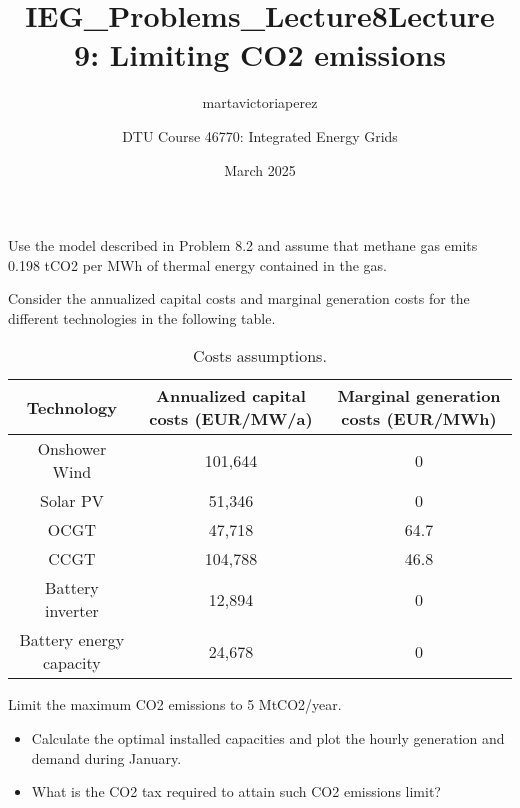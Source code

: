 \documentclass[10pt]{article}
\title{IEG_Problems_Lecture8}
\author{martavictoriaperez }
\date{March 2025}
\newenvironment{problem}[2][Problem]{\begin{trivlist}
\item[\hskip \labelsep {\bfseries #1}\hskip \labelsep {\bfseries #2.}]}{\end{trivlist}}
\begin{document}
 
\title{\textbf{Lecture 9: Limiting CO2 emissions}}
\author{
DTU Course 46770: Integrated Energy Grids }
\maketitle

\begin{problem}{9.1}
Use the model described in Problem 8.2 and assume that methane gas emits 0.198 tCO2 per MWh of thermal energy contained in the gas. 

Consider the annualized capital costs and marginal generation costs for the different technologies in the following table.

\begin{table}[h]
    \centering
    \begin{tabular}{ccc}
    \hline
        Technology & Annualized capital costs (EUR/MW/a) & Marginal generation costs (EUR/MWh) \\
    \hline
    Onshower Wind &  101,644 & 0 \\
         Solar PV &  51,346 & 0 \\
         OCGT & 47,718 &  64.7  \\
         CCGT & 104,788 &  46.8   \\
         Battery inverter & 12,894  & 0 \\
         Battery energy capacity &  24,678 & 0 \\
    \hline
    \end{tabular}
    \caption{Costs assumptions.}
    \label{tab:my_label}
\end{table}


Limit the maximum CO2 emissions to 5 MtCO2/year. 

\begin{itemize}
\item[a)] Calculate the optimal installed capacities and plot the hourly generation and demand during January.
\item[b)] What is the CO2 tax required to attain such CO2 emissions limit?
\end{itemize}

\end{problem}


\end{document}
